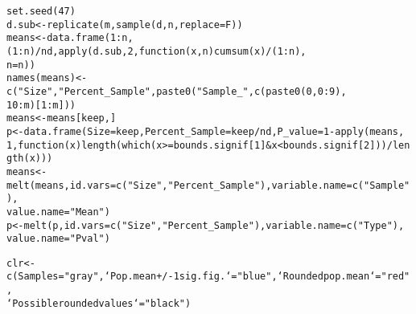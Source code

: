\documentclass{article}\usepackage[]{graphicx}\usepackage[]{color}
\makeatletter
\newcommand{\hlnum}[1]{\textcolor[rgb]{0.863,0.196,0.184}{#1}}%
\newcommand{\hlstr}[1]{\textcolor[rgb]{0.863,0.196,0.184}{#1}}%
\newcommand{\hlopt}[1]{\textcolor[rgb]{0.576,0.631,0.631}{#1}}%
\newcommand{\hlstd}[1]{\textcolor[rgb]{0.514,0.58,0.588}{#1}}%
\newcommand{\hlkwa}[1]{\textcolor[rgb]{0.796,0.294,0.086}{#1}}%
\newcommand{\hlkwb}[1]{\textcolor[rgb]{0.522,0.6,0}{#1}}%
\newcommand{\hlkwc}[1]{\textcolor[rgb]{0.796,0.294,0.086}{#1}}%
\newcommand{\hlkwd}[1]{\textcolor[rgb]{0.576,0.631,0.631}{#1}}%
\newenvironment{kframe}{%
 \def\at@end@of@kframe{}%
 \ifinner\ifhmode%
  \def\at@end@of@kframe{\end{minipage}}%
  \begin{minipage}{\columnwidth}%
 \fi\fi%
 \def\FrameCommand##1{\hskip\@totalleftmargin \hskip-\fboxsep
 \colorbox{shadecolor}{##1}\hskip-\fboxsep
     \hskip-\linewidth \hskip-\@totalleftmargin \hskip\columnwidth}%
 \MakeFramed {\advance\hsize-\width
   \@totalleftmargin\z@ \linewidth\hsize
   \@setminipage}}%
 {\par\unskip\endMakeFramed%
 \at@end@of@kframe}
\newenvironment{knitrout}{}{} %
\makeatother
\begin{document}
\begin{knitrout}
\begin{kframe}
\begin{alltt}
\hlkwd{set.seed}\hlstd{(}\hlnum{47}\hlstd{)}
\hlstd{d.sub} \hlkwb{<-} \hlkwd{replicate}\hlstd{(m,} \hlkwd{sample}\hlstd{(d, n,} \hlkwc{replace} \hlstd{= F))}
\hlstd{means} \hlkwb{<-} \hlkwd{data.frame}\hlstd{(}\hlnum{1}\hlopt{:}\hlstd{n, (}\hlnum{1}\hlopt{:}\hlstd{n)}\hlopt{/}\hlstd{nd,} \hlkwd{apply}\hlstd{(d.sub,} \hlnum{2}\hlstd{,} \hlkwa{function}\hlstd{(}\hlkwc{x}\hlstd{,} \hlkwc{n}\hlstd{)} \hlkwd{cumsum}\hlstd{(x)}\hlopt{/}\hlstd{(}\hlnum{1}\hlopt{:}\hlstd{n),}
    \hlkwc{n} \hlstd{= n))}
\hlkwd{names}\hlstd{(means)} \hlkwb{<-} \hlkwd{c}\hlstd{(}\hlstr{"Size"}\hlstd{,} \hlstr{"Percent_Sample"}\hlstd{,} \hlkwd{paste0}\hlstd{(}\hlstr{"Sample_"}\hlstd{,} \hlkwd{c}\hlstd{(}\hlkwd{paste0}\hlstd{(}\hlnum{0}\hlstd{,} \hlnum{0}\hlopt{:}\hlnum{9}\hlstd{),}
    \hlnum{10}\hlopt{:}\hlstd{m)[}\hlnum{1}\hlopt{:}\hlstd{m]))}
\hlstd{means} \hlkwb{<-} \hlstd{means[keep, ]}
\hlstd{p} \hlkwb{<-} \hlkwd{data.frame}\hlstd{(}\hlkwc{Size} \hlstd{= keep,} \hlkwc{Percent_Sample} \hlstd{= keep}\hlopt{/}\hlstd{nd,} \hlkwc{P_value} \hlstd{=} \hlnum{1} \hlopt{-} \hlkwd{apply}\hlstd{(means,}
    \hlnum{1}\hlstd{,} \hlkwa{function}\hlstd{(}\hlkwc{x}\hlstd{)} \hlkwd{length}\hlstd{(}\hlkwd{which}\hlstd{(x} \hlopt{>=} \hlstd{bounds.signif[}\hlnum{1}\hlstd{]} \hlopt{&} \hlstd{x} \hlopt{<} \hlstd{bounds.signif[}\hlnum{2}\hlstd{]))}\hlopt{/}\hlkwd{length}\hlstd{(x)))}
\hlstd{means} \hlkwb{<-} \hlkwd{melt}\hlstd{(means,} \hlkwc{id.vars} \hlstd{=} \hlkwd{c}\hlstd{(}\hlstr{"Size"}\hlstd{,} \hlstr{"Percent_Sample"}\hlstd{),} \hlkwc{variable.name} \hlstd{=} \hlkwd{c}\hlstd{(}\hlstr{"Sample"}\hlstd{),}
    \hlkwc{value.name} \hlstd{=} \hlstr{"Mean"}\hlstd{)}
\hlstd{p} \hlkwb{<-} \hlkwd{melt}\hlstd{(p,} \hlkwc{id.vars} \hlstd{=} \hlkwd{c}\hlstd{(}\hlstr{"Size"}\hlstd{,} \hlstr{"Percent_Sample"}\hlstd{),} \hlkwc{variable.name} \hlstd{=} \hlkwd{c}\hlstd{(}\hlstr{"Type"}\hlstd{),}
    \hlkwc{value.name} \hlstd{=} \hlstr{"Pval"}\hlstd{)}

\hlstd{clr} \hlkwb{<-} \hlkwd{c}\hlstd{(}\hlkwc{Samples} \hlstd{=} \hlstr{"gray"}\hlstd{,} \hlkwc{`Pop. mean +/- 1 sig. fig.`} \hlstd{=} \hlstr{"blue"}\hlstd{,} \hlkwc{`Rounded pop. mean`} \hlstd{=} \hlstr{"red"}\hlstd{,}
    \hlkwc{`Possible rounded values`} \hlstd{=} \hlstr{"black"}\hlstd{)}
\end{alltt}
\end{kframe}
\end{knitrout}
\end{document}
